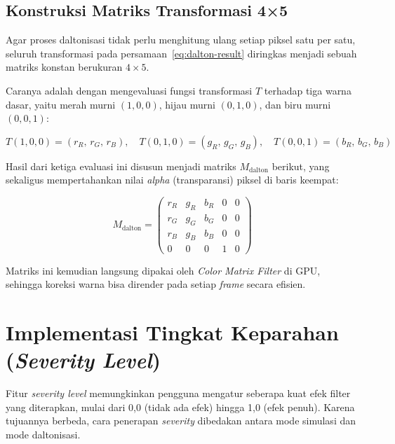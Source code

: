 \subsection{Konstruksi Matriks Transformasi 4×5}

Agar proses daltonisasi tidak perlu menghitung ulang setiap piksel satu per satu, seluruh transformasi pada persamaan~\ref{eq:dalton-result} diringkas menjadi sebuah matriks konstan berukuran $4 \times 5$.

Caranya adalah dengan mengevaluasi fungsi transformasi $T$ terhadap tiga warna dasar, yaitu merah murni $(1, 0, 0)$, hijau murni $(0, 1, 0)$, dan biru murni $(0, 0, 1)$:

\begin{equation}
  T(1, 0, 0) = (r_R,\, r_G,\, r_B), \quad
  T(0, 1, 0) = (g_R,\, g_G,\, g_B), \quad
  T(0, 0, 1) = (b_R,\, b_G,\, b_B)
  \label{eq:basis}
\end{equation}

Hasil dari ketiga evaluasi ini disusun menjadi matriks $M_{\text{dalton}}$ berikut, yang sekaligus mempertahankan nilai \textit{alpha} (transparansi) piksel di baris keempat:

\begin{equation}
  M_{\text{dalton}} =
  \begin{pmatrix}
    r_R & g_R & b_R & 0 & 0 \\
    r_G & g_G & b_G & 0 & 0 \\
    r_B & g_B & b_B & 0 & 0 \\
    0   & 0   & 0   & 1 & 0
  \end{pmatrix}
  \label{eq:dalton-matrix}
\end{equation}

Matriks ini kemudian langsung dipakai oleh \textit{Color Matrix Filter} di GPU, sehingga koreksi warna bisa dirender pada setiap \textit{frame} secara efisien.


\section{Implementasi Tingkat Keparahan (\textit{Severity Level})}

Fitur \textit{severity level} memungkinkan pengguna mengatur seberapa kuat efek filter yang diterapkan, mulai dari 0,0 (tidak ada efek) hingga 1,0 (efek penuh).
Karena tujuannya berbeda, cara penerapan \textit{severity} dibedakan antara mode simulasi dan mode daltonisasi.

